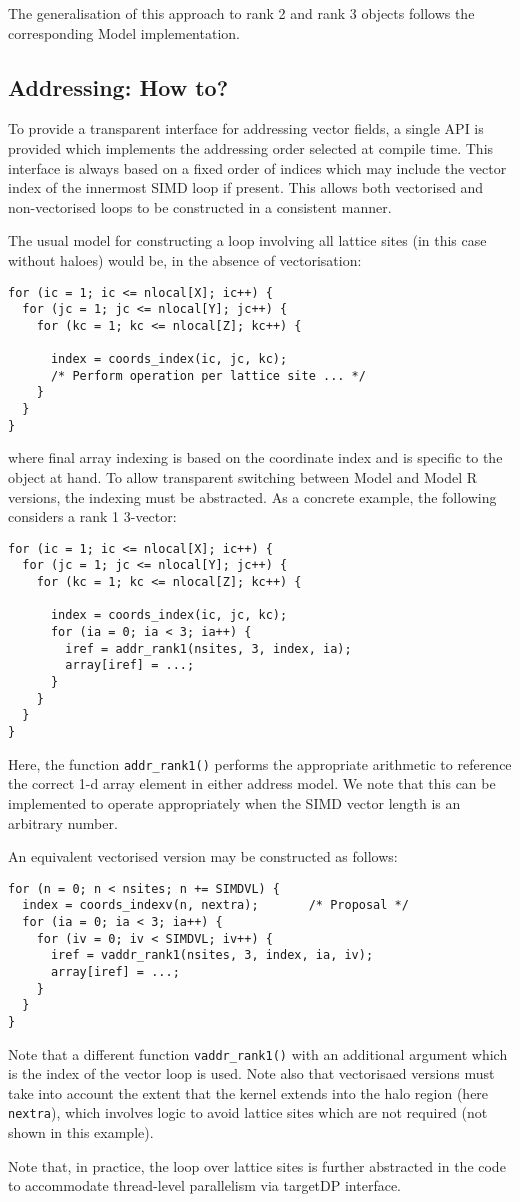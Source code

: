 The generalisation of this approach to rank 2 and rank 3 objects 
follows the corresponding Model implementation.

\subsection{Addressing: How to?}
\label{subsection:addressing-how-to}

To provide a transparent interface for addressing vector fields,
a single API is provided which implements the addressing order
selected at compile time. This interface is always based
on a fixed order of indices which may include the
vector index of the innermost SIMD loop if present. This
allows both vectorised and non-vectorised loops to be constructed
in a consistent manner.

The usual model for constructing a loop involving all lattice sites
(in this case without haloes) would be, in the absence of vectorisation:
\begin{lstlisting}
for (ic = 1; ic <= nlocal[X]; ic++) {
  for (jc = 1; jc <= nlocal[Y]; jc++) {
    for (kc = 1; kc <= nlocal[Z]; kc++) {

      index = coords_index(ic, jc, kc);
      /* Perform operation per lattice site ... */
    }
  }
}
\end{lstlisting}
where final array indexing is based on the coordinate index and is
specific to the object at hand. To allow transparent switching
between Model and Model R versions, the indexing must be abstracted.
As a concrete example, the following considers a rank 1 3-vector:
\begin{lstlisting}
for (ic = 1; ic <= nlocal[X]; ic++) {
  for (jc = 1; jc <= nlocal[Y]; jc++) {
    for (kc = 1; kc <= nlocal[Z]; kc++) {

      index = coords_index(ic, jc, kc);
      for (ia = 0; ia < 3; ia++) {
        iref = addr_rank1(nsites, 3, index, ia);
        array[iref] = ...;
      }
    }
  }
}
\end{lstlisting}
Here, the function \texttt{addr\_rank1()} performs the appropriate
arithmetic to reference the correct 1-d array element in either
address model. We note that
this can be implemented to operate appropriately when the SIMD vector
length is an arbitrary number.

An equivalent vectorised version may be constructed as follows:
\begin{lstlisting}
for (n = 0; n < nsites; n += SIMDVL) {
  index = coords_indexv(n, nextra);       /* Proposal */
  for (ia = 0; ia < 3; ia++) {
    for (iv = 0; iv < SIMDVL; iv++) {
      iref = vaddr_rank1(nsites, 3, index, ia, iv);
      array[iref] = ...;
    }
  }
}
\end{lstlisting}
Note that a different function \texttt{vaddr\_rank1()} with an additional
argument which is the index of the vector loop is used. Note also that
vectorisaed versions must take into account the extent that the kernel
extends into the halo region (here \texttt{nextra}), which involves
logic to avoid lattice sites which are not required (not shown in this
example).

Note that, in practice, 
the loop over lattice sites is further abstracted in the code to
accommodate thread-level parallelism via targetDP interface.

\vfill
\pagebreak

